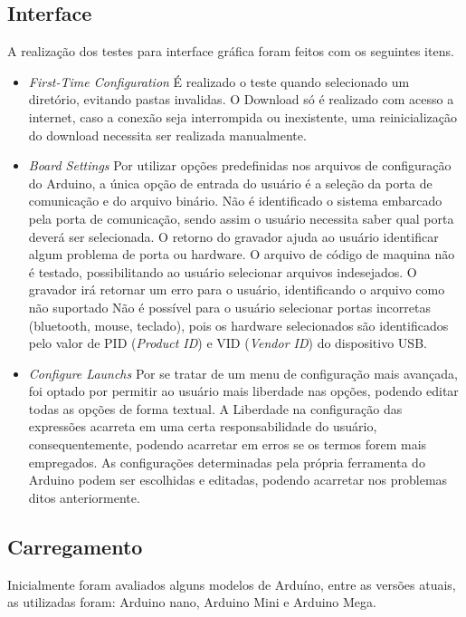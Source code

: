 \subsection{Interface}
A realização dos testes para interface gráfica foram feitos com os seguintes itens.
\begin{itemize}
\item \textit{First-Time Configuration}
\subitem É realizado o teste quando selecionado um diretório, evitando pastas invalidas.
\subitem O Download só é realizado com acesso a internet, caso a conexão seja interrompida ou inexistente, uma reinicialização do download necessita ser realizada manualmente.

\item  \textit{Board Settings}
\subitem Por utilizar opções predefinidas nos arquivos de configuração do Arduino, a única opção de entrada do usuário é a seleção da porta de comunicação e do arquivo binário. 
\subitem Não é identificado o sistema embarcado pela porta de comunicação, sendo assim o usuário necessita saber qual porta deverá ser selecionada. O retorno do gravador ajuda ao usuário identificar algum problema de porta ou hardware.
\subitem O arquivo de código de maquina não é testado, possibilitando ao usuário selecionar arquivos indesejados. O gravador irá retornar um erro para o usuário, identificando o arquivo como não suportado
\subitem Não é possível para o usuário selecionar portas incorretas (bluetooth, mouse, teclado), pois os hardware selecionados são identificados pelo valor de PID (\textit{Product ID}) e VID (\textit{Vendor ID}) do dispositivo USB.

\item  \textit{Configure Launchs}
\subitem Por se tratar de um menu de configuração mais avançada, foi optado por permitir ao usuário mais liberdade nas opções, podendo editar todas as opções de forma textual. A Liberdade na configuração das expressões acarreta em uma certa responsabilidade do usuário, consequentemente, podendo acarretar em erros se os termos forem mais empregados.
\subitem As configurações determinadas pela própria ferramenta do Arduino podem ser escolhidas e editadas, podendo acarretar nos problemas ditos anteriormente.

\end{itemize}

\subsection{Carregamento}
Inicialmente foram avaliados alguns modelos de Arduíno, entre as versões atuais, as utilizadas foram: Arduino nano, Arduino Mini e Arduino Mega.

